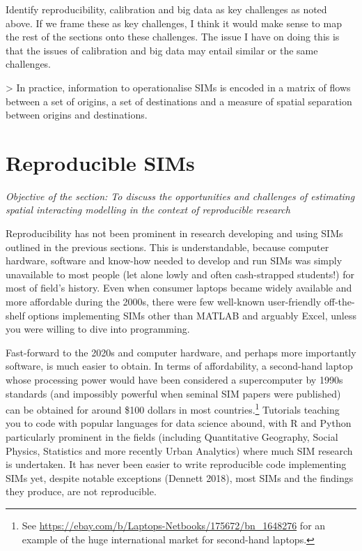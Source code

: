\documentclass[11pt,letterpaper]{article}
\begin{document}
Identify reproducibility, calibration and big data as key challenges as noted above.
If we frame these as key challenges, I think it would make sense to map the rest of the sections onto these challenges.
The issue I have on doing this is that the issues of calibration and big data may entail similar or the same challenges.

\textgreater{} In practice, information to operationalise SIMs is encoded in a matrix of flows between a set of origins, a set of destinations and a measure of spatial separation between origins and destinations.

\hypertarget{reproducible-sims}{%
\section{\texorpdfstring{Reproducible SIMs }{Reproducible SIMs }}\label{reproducible-sims}}

\emph{Objective of the section: To discuss the opportunities and challenges of estimating spatial interacting modelling in the context of reproducible research}

Reproducibility has not been prominent in research developing and using SIMs outlined in the previous sections.
This is understandable, because computer hardware, software and know-how needed to develop and run SIMs was simply unavailable to most people (let alone lowly and often cash-strapped students!) for most of field's history.
Even when consumer laptops became widely available and more affordable during the 2000s, there were few well-known user-friendly off-the-shelf options implementing SIMs other than MATLAB and arguably Excel, unless you were willing to dive into programming.

Fast-forward to the 2020s and computer hardware, and perhaps more importantly software, is much easier to obtain.
In terms of affordability, a second-hand laptop whose processing power would have been considered a supercomputer by 1990s standards (and impossibly powerful when seminal SIM papers were published) can be obtained for around \$100 dollars in most countries.\footnote{See \url{https://ebay.com/b/Laptops-Netbooks/175672/bn_1648276} for an example of the huge international market for second-hand laptops.}
Tutorials teaching you to code with popular languages for data science abound, with R and Python particularly prominent in the fields (including Quantitative Geography, Social Physics, Statistics and more recently Urban Analytics) where much SIM research is undertaken.
It has never been easier to write reproducible code implementing SIMs yet, despite notable exceptions (Dennett 2018), most SIMs and the findings they produce, are not reproducible.
\end{document}
